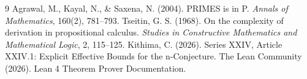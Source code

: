 \documentclass[11pt,a4paper]{article}
\begin{document}

\begin{thebibliography}{9}
  Agrawal, M., Kayal, N., \& Saxena, N. (2004). PRIMES is in P. \emph{Annals of Mathematics}, 160(2), 781–793.
  Tseitin, G. S. (1968). On the complexity of derivation in propositional calculus. \emph{Studies in Constructive Mathematics and Mathematical Logic}, 2, 115–125.
  Kithima, C. (2026). Series XXIV, Article XXIV.1: Explicit Effective Bounds for the n‑Conjecture.
  The Lean Community (2026). Lean 4 Theorem Prover Documentation.
\end{thebibliography}
\end{document}

